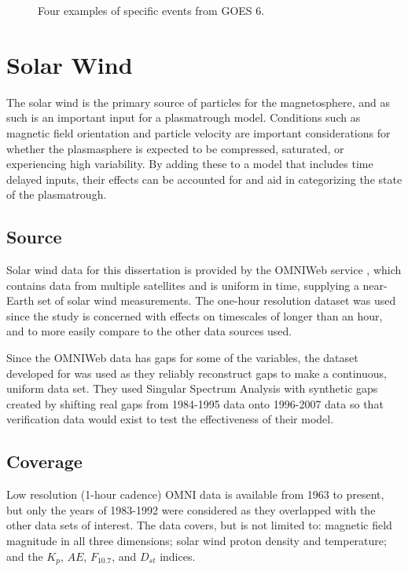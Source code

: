 \begin{figure}[htp!]
	\caption{Four examples of specific events from GOES 6.}
	\label{fig:alldata-examples}
\end{figure}





\section{Solar Wind}
The solar wind is the primary source of particles for the magnetosphere, and as such is an important input for a plasmatrough model. Conditions such as magnetic field orientation and particle velocity are important considerations for whether the plasmasphere is expected to be compressed, saturated, or experiencing high variability. By adding these to a model that includes time delayed inputs, their effects can be accounted for and aid in categorizing the state of the plasmatrough.

\subsection{Source}
Solar wind data for this dissertation is provided by the OMNIWeb service \citep{OMNIWebKing2005}, which contains data from multiple satellites and is uniform in time, supplying a near-Earth set of solar wind measurements. The one-hour resolution dataset was used since the study is concerned with effects on timescales of longer than an hour, and to more easily compare to the other data sources used. 

Since the OMNIWeb data has gaps for some of the variables, the dataset developed for \cite{Kondrashov2014ReconstructionOfGaps} was used as they reliably reconstruct gaps to make a continuous, uniform data set. They used Singular Spectrum Analysis with synthetic gaps created by shifting real gaps from 1984-1995 data onto 1996-2007 data so that verification data would exist to test the effectiveness of their model. 

\subsection{Coverage}
Low resolution (1-hour cadence) OMNI data is available from 1963 to present, but only the years of 1983-1992 were considered as they overlapped with the other data sets of interest. The data covers, but is not limited to: magnetic field magnitude in all three dimensions; solar wind proton density and temperature; and the $K_p$, $AE$, $F_{10.7}$, and $D_{st}$ indices.

